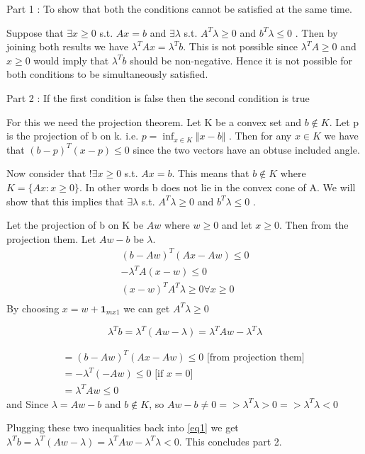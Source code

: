 \documentclass[12pt]{article}
\begin{document}
Part 1 : To show that both the conditions cannot be satisfied at the same time. 

Suppose that $\exists x \ge 0$ s.t. $Ax=b$ and $\exists \lambda$ s.t. $A^T\lambda \geq 0$ and $b^T\lambda \leq 0$ . Then by joining both results we have $\lambda^TAx = \lambda^Tb$. This is not possible since $\lambda^TA \geq 0$ and $x \geq 0$ would imply that $\lambda^Tb$ should be non-negative. Hence it is not possible for both conditions to be simultaneously satisfied. 

Part 2 : If the first condition is false then the second condition is true

For this we need the projection theorem. Let K be a convex set and $b \notin K$. Let p is the projection of b on k. i.e. $p = \inf_{x \in K}\Vert x - b \Vert$ . Then for any $x \in K$ we have that $(b-p)^T(x-p) \leq 0$ since the two vectors have an obtuse included angle. 

Now consider that $!\exists x \geq 0$ s.t. $Ax=b$. This means that $b \notin K $ where $K = \{ Ax : x \geq 0\}$. In other words b does not lie in the convex cone of A. We will show that this implies that $\exists \lambda$ s.t. $A^T\lambda \geq 0$ and $b^T\lambda \leq 0$ . 

Let the projection of b on K be $Aw$ where $w \geq 0$ and let $x \geq 0$. Then from the projection them. Let $Aw-b$ be $\lambda$. 
\begin{align*}
(b-Aw)^T(Ax-Aw) \leq 0  \\
-\lambda^TA(x-w) \leq 0 \\
(x-w)^TA^T\lambda \geq 0 \forall x \geq 0 \\
\end{align*}
By choosing $x = w + \textbf{1}_{mx1} $ we can get $A^T\lambda \geq 0$

\begin{equation}
\label{eq1}
\lambda^Tb = \lambda^T(Aw-\lambda) = \lambda^TAw - \lambda^T\lambda
\end{equation}

\begin{align*}
= (b-Aw)^T(Ax-Aw) \leq 0 \text{ [from projection them] }\\
= -\lambda^T(-Aw) \leq 0 \text{ [if $x=0$] } \\
= \lambda^T Aw \leq 0
\end{align*}
and
Since $\lambda =Aw-b$ and $b \notin K$, so $Aw-b \neq 0 => \lambda^T\lambda > 0 => \lambda^T\lambda  < 0$ 

Plugging these two inequalities back into \ref{eq1} we get $\lambda^Tb = \lambda^T(Aw-\lambda) = \lambda^TAw - \lambda^T\lambda < 0$. This concludes part 2. 
\end{document}
